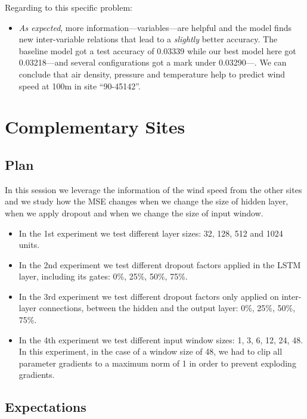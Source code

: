 \documentclass[]{article}
\begin{document}
	Regarding to this specific problem:
	
	\begin{itemize}
		\item \emph{As expected}, more information---variables---are helpful and the model finds new inter-variable relations that lead to a \emph{slightly} better accuracy. The baseline model got a test accuracy of 0.03339 while our best model here got 0.03218---and several configurations got a mark under 0.03290---. We can conclude that air density, pressure and temperature help to predict wind speed at 100m in site ``90-45142''.
	\end{itemize}
	
	\section{Complementary Sites}
	
	\subsection{Plan}
	
	In this session we leverage the information of the wind speed from the other sites and we study how the MSE changes when we change the size of hidden layer, when we apply dropout and when we change the size of input window.
	
	\begin{itemize}
		\item In the 1st experiment we test different layer sizes: 32, 128, 512 and 1024 units.
		
		\item In the 2nd experiment we test different dropout factors applied in the LSTM layer, including its gates: 0\%, 25\%, 50\%, 75\%.
		
		\item In the 3rd experiment we test different dropout factors only applied on inter-layer connections, between the hidden and the output layer: 0\%, 25\%, 50\%, 75\%.
		
		\item In the 4th experiment we test different input window sizes: 1, 3, 6, 12, 24, 48. In this experiment, in the case of a window size of 48, we had to clip all parameter gradients to a maximum norm of 1 in order to prevent exploding gradients.
	\end{itemize}
	
	\subsection{Expectations}
	
\end{document}

